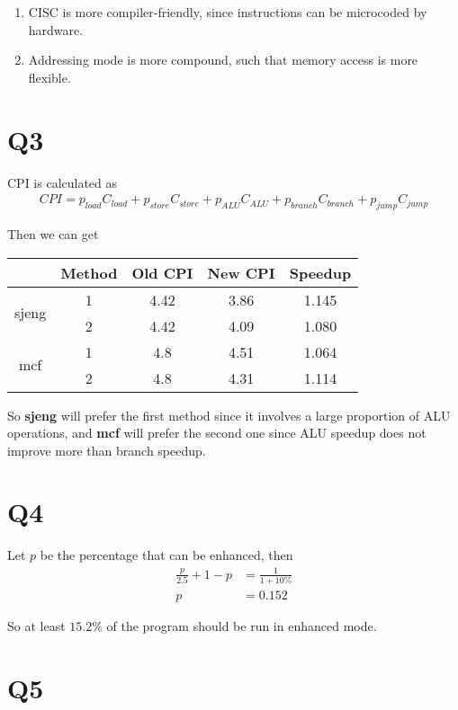\documentclass[12pt]{article}
\begin{document}
\begin{enumerate}
	\item CISC is more compiler-friendly, since instructions can be microcoded by hardware.
	\item Addressing mode is more compound, such that memory access is more flexible.
\end{enumerate}

\section*{Q3}

CPI is calculated as 
\begin{align*}
	CPI = p_{load}C_{load} + p_{store}C_{store} + p_{ALU}C_{ALU} + p_{branch}C_{branch} + p_{jump}C_{jump}
\end{align*}

Then we can get
\begin{table}[hbtp]
	\centering
	\begin{tabular}{|c|c|c|c|c|}
		\hline
		 & Method & Old CPI & New CPI & Speedup\\
		\hline
		\multirow{2}{*}{sjeng}
		 & 1 & 4.42 & 3.86 & 1.145\\
		\cline{2-5}
		 & 2 & 4.42 & 4.09 & 1.080\\
		\hline
		\multirow{2}{*}{mcf}
		 & 1 & 4.8 & 4.51 & 1.064\\
		\cline{2-5}
		 & 2 & 4.8 & 4.31 & 1.114\\
		\hline 
	\end{tabular}
\end{table}

So \textbf{sjeng} will prefer the first method since it involves a large proportion of ALU operations, and \textbf{mcf} will prefer the second one since ALU speedup does not improve more than branch speedup.

\section*{Q4}

Let $p$ be the percentage that can be enhanced, then
\begin{align*}
	\frac{p}{2.5} + 1 - p &= \frac{1}{1 + 10\%}\\
	p &= 0.152
\end{align*}

So at least $15.2\%$ of the program should be run in enhanced mode.

\section*{Q5}
\end{document}
